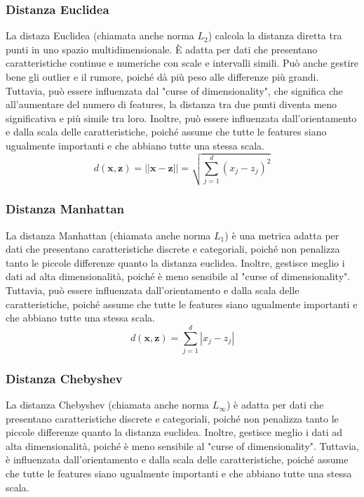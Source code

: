 \subsubsection{Distanza Euclidea} 
La distaza Euclidea (chiamata anche norma $L_2$) calcola la distanza diretta tra punti in uno spazio multidimensionale. 
È adatta per dati 
che presentano caratteristiche continue e numeriche con scale e intervalli simili. 
Può anche gestire bene gli outlier e il rumore, poiché dà più peso alle differenze più grandi. 
Tuttavia, può essere influenzata dal "curse of dimensionality", che significa che all'aumentare 
del numero di features, la distanza tra due punti diventa meno significativa e più simile tra loro.
Inoltre, può essere influenzata dall'orientamento e dalla scala delle 
    caratteristiche, poiché assume che tutte le features siano ugualmente 
    importanti e che abbiano tutte una stessa scala.
    \[
    d(\mathbf{x}, \mathbf{z}) = ||\mathbf{x} - \mathbf{z}|| = \sqrt{\sum_{j=1}^d (x_j - z_j)^2}
    \]    

\subsubsection{Distanza Manhattan} La distanza Manhattan (chiamata anche norma $L_1$) 
    è una metrica adatta per dati che presentano caratteristiche discrete e 
    categoriali, poiché non penalizza tanto le piccole differenze 
    quanto la distanza euclidea. Inoltre, gestisce meglio i dati ad alta 
    dimensionalità, poiché è meno sensibile al "curse of dimensionality". 
    Tuttavia, può essere influenzata dall'orientamento e dalla scala delle 
    caratteristiche, poiché assume che tutte le features siano ugualmente 
    importanti e che abbiano tutte una stessa scala.
    \[
    d(\mathbf{x}, \mathbf{z}) = \sum_{j=1}^d |x_j - z_j|
    \]

\subsubsection{Distanza Chebyshev} La distanza Chebyshev (chiamata anche norma $L_{\infty}$) 
    è adatta per dati che presentano caratteristiche discrete e 
    categoriali, poiché non penalizza tanto le piccole differenze 
    quanto la distanza euclidea. Inoltre, gestisce meglio i dati ad alta 
    dimensionalità, poiché è meno sensibile al "curse of dimensionality". 
    Tuttavia, è influenzata dall'orientamento e dalla scala delle 
    caratteristiche, poiché assume che tutte le features siano ugualmente 
    importanti e che abbiano tutte una stessa scala.

